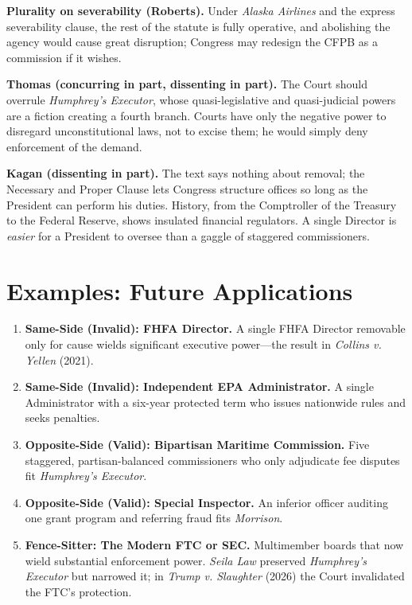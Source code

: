\documentclass[12pt]{article}
\begin{document}
\textbf{Plurality on severability (Roberts).} Under \textit{Alaska Airlines} and the express severability clause, the rest of the statute is fully operative, and abolishing the agency would cause great disruption; Congress may redesign the CFPB as a commission if it wishes.

\textbf{Thomas (concurring in part, dissenting in part).} The Court should overrule \textit{Humphrey's Executor}, whose quasi-legislative and quasi-judicial powers are a fiction creating a fourth branch. Courts have only the negative power to disregard unconstitutional laws, not to excise them; he would simply deny enforcement of the demand.

\textbf{Kagan (dissenting in part).} The text says nothing about removal; the Necessary and Proper Clause lets Congress structure offices so long as the President can perform his duties. History, from the Comptroller of the Treasury to the Federal Reserve, shows insulated financial regulators. A single Director is \emph{easier} for a President to oversee than a gaggle of staggered commissioners.

\section{Examples: Future Applications}

\begin{enumerate}
\item \textbf{Same-Side (Invalid): FHFA Director.} A single FHFA Director removable only for cause wields significant executive power---the result in \textit{Collins v. Yellen} (2021).
\item \textbf{Same-Side (Invalid): Independent EPA Administrator.} A single Administrator with a six-year protected term who issues nationwide rules and seeks penalties.
\item \textbf{Opposite-Side (Valid): Bipartisan Maritime Commission.} Five staggered, partisan-balanced commissioners who only adjudicate fee disputes fit \textit{Humphrey's Executor}.
\item \textbf{Opposite-Side (Valid): Special Inspector.} An inferior officer auditing one grant program and referring fraud fits \textit{Morrison}.
\item \textbf{Fence-Sitter: The Modern FTC or SEC.} Multimember boards that now wield substantial enforcement power. \textit{Seila Law} preserved \textit{Humphrey's Executor} but narrowed it; in \textit{Trump v. Slaughter} (2026) the Court invalidated the FTC's protection.
\end{enumerate}
\end{document}
